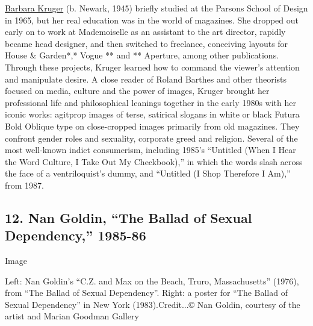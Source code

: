 \href{http://www.barbarakruger.com/}{Barbara Kruger} (b. Newark, 1945)
briefly studied at the Parsons School of Design in 1965, but her real
education was in the world of magazines. She dropped out early on to
work at Mademoiselle as an assistant to the art director, rapidly became
head designer, and then switched to freelance, conceiving layouts for
House \& Garden*,* Vogue ** and ** Aperture, among other publications.
Through these projects, Kruger learned how to command the viewer's
attention and manipulate desire. A close reader of Roland Barthes and
other theorists focused on media, culture and the power of images,
Kruger brought her professional life and philosophical leanings together
in the early 1980s with her iconic works: agitprop images of terse,
satirical slogans in white or black Futura Bold Oblique type on
close-cropped images primarily from old magazines. They confront gender
roles and sexuality, corporate greed and religion. Several of the most
well-known indict consumerism, including 1985's ``Untitled (When I Hear
the Word Culture, I Take Out My Checkbook),'' in which the words slash
across the face of a ventriloquist's dummy, and ``Untitled (I Shop
Therefore I Am),'' from 1987.

\hypertarget{12-nan-goldin-the-ballad-of-sexual-dependency-1985-86}{%
\subsection{12. Nan Goldin, ``The Ballad of Sexual Dependency,''
1985-86}\label{12-nan-goldin-the-ballad-of-sexual-dependency-1985-86}}

Image

Left: Nan Goldin's ``C.Z. and Max on the Beach, Truro, Massachusetts''
(1976), from ``The Ballad of Sexual Dependency''. Right: a poster for
``The Ballad of Sexual Dependency'' in New York (1983).Credit...© Nan
Goldin, courtesy of the artist and Marian Goodman Gallery


